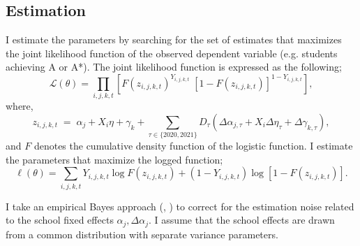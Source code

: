 \subsection{Estimation}
I estimate the parameters by searching for the set of estimates that maximizes the joint likelihood function of the observed dependent variable (e.g. students achieving A or A*). The joint likelihood function is expressed as the following;
\[
\mathcal{L}(\theta)
=
\prod_{i,j,k,t}
\left[
    F\!\left( z_{i,j,k,t} \right)^{Y_{i,j,k,t}}
    \;
    \left[ 1 - F\!\left( z_{i,j,k,t} \right) \right]^{1 - Y_{i,j,k,t}}
\right],
\]
where,
\[
z_{i,j,k,t} \;=\;
\alpha_j
+ X_i \eta
+ \gamma_k
+ \sum_{\tau \in \{2020,2021\}}
    D_\tau
    \left(
        \Delta\alpha_{j,\tau}
        + X_i \Delta\eta_{\tau}
        + \Delta\gamma_{k,\tau}
    \right),
\]
and $F$ denotes the cumulative density function of the logistic function. I estimate the parameters that maximize the logged function; 
\[
\ell(\theta)
=
\sum_{i,j,k,t}
    Y_{i,j,k,t} \log F\!\left( z_{i,j,k,t} \right)
    +
    \left( 1 - Y_{i,j,k,t} \right)
    \log\left[ 1 - F\!\left( z_{i,j,k,t} \right) \right].
\]


I take an empirical Bayes approach (\cite{WALTERS2024183}, \cite{b933f52e-83fe-34bb-bf19-f7f3e5459001}) to correct for the estimation noise related to the school fixed effects $\alpha_j, \Delta\alpha_j$. I assume that the school effects are drawn from a common distribution with separate variance parameters.

